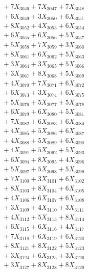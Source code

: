 \documentclass[a4paper,10pt]{article}
\begin{document}
{\begin{align}
&\;  + 7 X_{3046} + 7 X_{3047} + 7 X_{3048} \\[0.3ex]
&\;  + 6 X_{3049} + 3 X_{3050} + 6 X_{3051} \\[0.3ex]
&\;  + 8 X_{3052} + 4 X_{3053} + 6 X_{3054} \\[0.3ex]
&\;  + 6 X_{3055} + 6 X_{3056} + 5 X_{3057} \\[0.3ex]
&\;  + 5 X_{3058} + 7 X_{3059} + 3 X_{3060} \\[0.3ex]
&\;  + 8 X_{3061} + 6 X_{3062} + 5 X_{3063} \\[0.3ex]
&\;  + 3 X_{3064} + 3 X_{3065} + 5 X_{3066} \\[0.3ex]
&\;  + 3 X_{3067} + 8 X_{3068} + 5 X_{3069} \\[0.5ex]\allowbreak
&\;  + 4 X_{3070} + 7 X_{3071} + 6 X_{3072} \\[0.3ex]
&\;  + 6 X_{3073} + 3 X_{3074} + 6 X_{3075} \\[0.3ex]
&\;  + 5 X_{3076} + 5 X_{3077} + 5 X_{3078} \\[0.3ex]
&\;  + 6 X_{3079} + 6 X_{3080} + 5 X_{3081} \\[0.3ex]
&\;  + 7 X_{3082} + 6 X_{3083} + 6 X_{3084} \\[0.3ex]
&\;  + 4 X_{3085} + 5 X_{3086} + 6 X_{3087} \\[0.3ex]
&\;  + 4 X_{3088} + 5 X_{3089} + 6 X_{3090} \\[0.3ex]
&\;  + 4 X_{3091} + 5 X_{3092} + 5 X_{3093} \\[0.3ex]
&\;  + 6 X_{3094} + 8 X_{3095} + 4 X_{3096} \\[0.3ex]
&\;  + 5 X_{3097} + 5 X_{3098} + 5 X_{3099} \\[0.5ex]\allowbreak
&\;  + 7 X_{3100} + 3 X_{3101} + 6 X_{3102} \\[0.3ex]
&\;  + 8 X_{3103} + 8 X_{3104} + 6 X_{3105} \\[0.3ex]
&\;  + 4 X_{3106} + 6 X_{3107} + 6 X_{3108} \\[0.3ex]
&\;  + 3 X_{3109} + 4 X_{3110} + 3 X_{3111} \\[0.3ex]
&\;  + 4 X_{3112} + 5 X_{3113} + 8 X_{3114} \\[0.3ex]
&\;  + 6 X_{3115} + 6 X_{3116} + 4 X_{3117} \\[0.3ex]
&\;  + 7 X_{3118} + 6 X_{3119} + 6 X_{3120} \\[0.3ex]
&\;  + 8 X_{3121} + 8 X_{3122} + 5 X_{3123} \\[0.3ex]
&\;  + 3 X_{3124} + 6 X_{3125} + 3 X_{3126} \\[0.3ex]
&\;  + 3 X_{3127} + 8 X_{3128} + 8 X_{3129} \\[0.5ex]\allowbreak

\end{align}}
\end{document}
